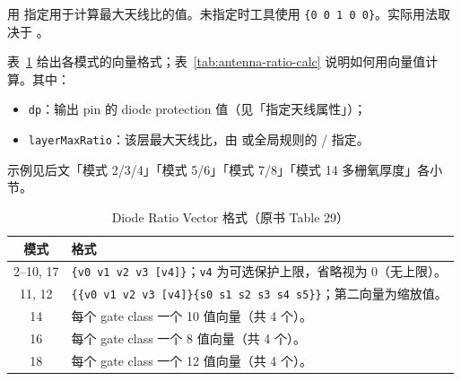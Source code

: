 用  指定用于计算最大天线比的值。未指定时工具使用 \texttt{\{0 0 1 0 0\}}。实际用法取决于 。

表~\ref{tab:diode-ratio-format} 给出各模式的向量格式；表~\ref{tab:antenna-ratio-calc} 说明如何用向量值计算。其中：
\begin{itemize}
  \item \texttt{dp}：输出 pin 的 diode protection 值（见「指定天线属性」）；
  \item \texttt{layerMaxRatio}：该层最大天线比，由  或全局规则的 / 指定。
\end{itemize}

示例见后文「模式 2/3/4」「模式 5/6」「模式 7/8」「模式 14 多栅氧厚度」各小节。

\begin{table}[htbp]
\centering
\caption{Diode Ratio Vector 格式（原书 Table 29）}
\label{tab:diode-ratio-format}
\begin{tabular}{@{}cp{}@{}}
\toprule
模式 & 格式 \\
\midrule
2--10, 17 & \texttt{\{v0 v1 v2 v3 [v4]\}}；\texttt{v4} 为可选保护上限，省略视为 0（无上限）。 \\
11, 12 & \texttt{\{\{v0 v1 v2 v3 [v4]\}\{s0 s1 s2 s3 s4 s5\}\}}；第二向量为缩放值。 \\
14 & 每个 gate class 一个 10 值向量（共 4 个）。 \\
16 & 每个 gate class 一个 8 值向量（共 4 个）。 \\
18 & 每个 gate class 一个 12 值向量（共 4 个）。 \\
\bottomrule
\end{tabular}
\end{table}

